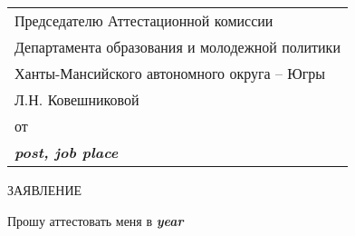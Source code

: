 \documentclass[14pt,a4paper]{extreport}
\newcommand{\gen}[1]{\textbf{\textit{#1}}}
\begin{document}
\begin{flushright}
\begin{tabular}{l}
	Председателю Аттестационной комиссии \\
	Департамента образования и молодежной политики \\
	Ханты-Мансийского автономного округа -- Югры \\
	Л.Н. Ковешниковой \\
	от \gen{\fiotpl} \\
	\gen{post, job place} \\
\end{tabular}
\end{flushright}
\vspace*{4mm}
\begin{center}
ЗАЯВЛЕНИЕ
\end{center}
\vspace*{4mm}

\noindent
Прошу аттестовать меня в \gen{year}
\end{document}

